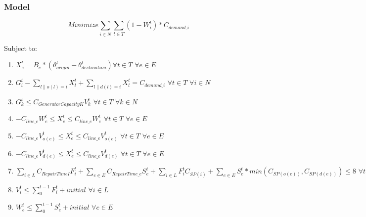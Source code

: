 \documentclass{article}
\begin{document}
	\subsubsection{Model}
	$$	Minimize \sum_{i \in N} \sum_{t \in T} (1-W_i^t)*C_{demand\_i} $$
	
	Subject to:
	\begin{enumerate}[label=(\arabic*), leftmargin=*, itemsep=0.4ex, before={\everymath{\displaystyle}}]%
		
		\item $ X_e^t = B_e * (\theta_{origin}^t - \theta_{destination}^t) \forall t \in T \hspace{4pt} \forall e \in E$
		\item $ G_i^t - \sum_{l\|o(l)=i} X_l^t + \sum_{l\|d(l)=i} X_l^t = C_{demand\_i} \hspace{4pt} \forall t \in T \hspace{4pt} \forall i \in N$
		\item $G_k^t \leq C_{GeneratorCapacityK} V_{k}^t \hspace{4pt} \forall t\in T \hspace{4pt} \forall k \in N$
		\item $-C_{line\_e}W_{e}^t \leq X_{e}^t \leq C_{line\_e}W_{e}^t \hspace{4pt} \forall t \in T \hspace{4pt} \forall e \in E$
		\item $-C_{line\_e}V_{o(e)}^t \leq X_{e}^t \leq C_{line\_e}V_{o(e)}^t \hspace{4pt} \forall t \in T \hspace{4pt} \forall e \in E$
		\item $-C_{line\_e}V_{d(e)}^t \leq X_{e}^t \leq C_{line\_e}V_{d(e)}^t \hspace{4pt} \forall t \in T \hspace{4pt} \forall e \in E$
		
		\item $\sum_{i \in L} C_{RepairTimeI} F_{i}^t +\sum_{e \in E} C_{RepairTime\_e} S_{e}^t + \sum_{i \in L} F_i^t C_{SP(i)} + \sum_{e \in E} S_{e}^t * min(C_{SP(o(e))},C_{SP(d(e))}) \leq 8 \hspace{4pt} \forall t \in T \hspace{4pt}$
		\item $V_i^t \leq \sum_{0}^{t-1} F_i^t+initial \hspace{4pt} \forall i \in L$ 
		\item $W_{e}^t \leq \sum_{0}^{t-1} S_{e}^t+initial \hspace{4pt} \forall e \in E $
	\end{enumerate}
\end{document}

